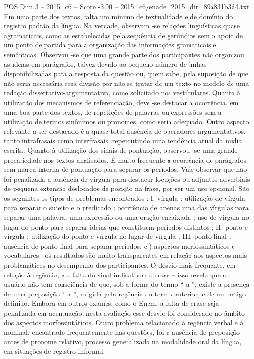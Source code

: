 \begin{textsample}{POS Dim 3 – 2015\_c6 – Score -3.00 – 2015\_c6/enade\_2015\_dir\_89a831b3d4.txt}
Em uma parte dos textos, falta um mínimo de textualidade e de domínio do registro padrão da língua.
Na verdade, observam -se relações linguísticas quase agramaticais, como as estabelecidas pela sequência de gerúndios sem o apoio de um ponto de partida para a organização das informações gramaticais e semânticas.
Observou -se que uma grande parte dos participantes não organizou as ideias em parágrafos, talvez devido ao pequeno número de linhas disponibilizadas para a resposta da questão ou, quem sabe, pela suposição de que não seria necessária essa divisão por não se tratar de um texto no modelo de uma redação dissertativo-argumentativa, como solicitado nos vestibulares.
Quanto à utilização dos mecanismos de referenciação, deve -se destacar a ocorrência, em uma boa parte dos textos, de repetições de palavras ou expressões sem a utilização de termos sinônimos ou pronomes, como seria adequado.
Outro aspecto relevante a ser destacado é a quase total ausência de operadores argumentativos, tanto intrafrasais como interfrasais, repercutindo uma tendência atual da mídia escrita.
Quanto à utilização dos sinais de pontuação, observou -se uma grande precariedade nos textos analisados.
É muito frequente a ocorrência de parágrafos sem marca interna de pontuação para separar os períodos.
Vale observar que não foi penalizada a ausência de vírgula para destacar locuções ou adjuntos adverbiais de pequena extensão deslocados de posição na frase, por ser um uso opcional.
São os seguintes os tipos de problemas encontrados : I. vírgula : utilização de vírgula para separar o sujeito e o predicado ; ocorrência de apenas uma das vírgulas para separar uma palavra, uma expressão ou uma oração encaixada ; uso de vírgula no lugar do ponto para separar ideias que constituem períodos distintos ; II. ponto e vírgula : utilização do ponto e vírgula no lugar de vírgula ; III. ponto final : ausência de ponto final para separar períodos. c ) aspectos morfossintáticos e vocabulares : os resultados são muito transparentes em relação aos aspectos mais problemáticos no desempenho dos participantes.
O desvio mais frequente, em relação à regência, é a falta do sinal indicativo da crase – isso revela que o usuário não tem consciência de que, sob a forma do termo “ a ”, existe a presença de uma preposição “ a ”, exigida pela regência do termo anterior, e de um artigo definido.
Embora em outros exames, como o Enem, a falta de crase seja penalizada em acentuação, nesta avaliação esse desvio foi considerado no âmbito dos aspectos morfossintáticos.
Outro problema relacionado à regência verbal e à nominal, encontrado frequentemente nas questões, foi a ausência de preposição antes de pronome relativo, processo generalizado na modalidade oral da língua, em situações de registro informal.

\end{textsample}
